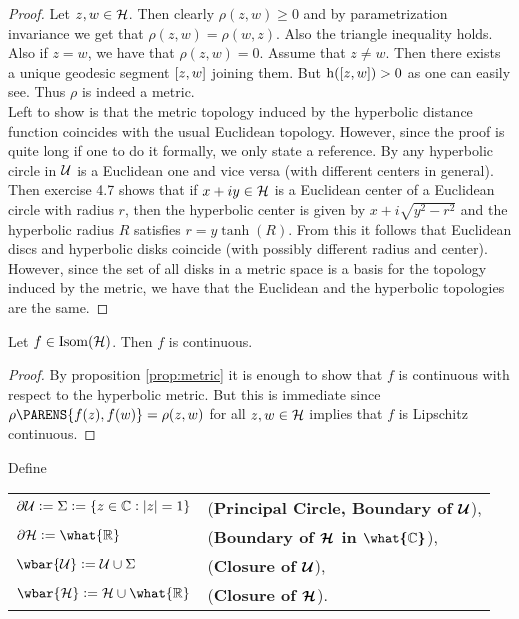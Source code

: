\begin{proof}
Let $z,w \in \mathcal{H}$. Then clearly $\rho(z,w) \geq 0$ and by parametrization invariance we get that $\rho(z,w) = \rho(w,z)$. Also the triangle inequality holds. Also if $z = w$, we have that $\rho(z,w) = 0$. Assume that $z \neq w$. Then there exists a unique geodesic segment $\sbr[0]{z,w}$ joining them. But $\h(\sbr[0]{z,w}) > 0$ as one can easily see. Thus $\rho$ is indeed a metric.\\
Left to show is that the metric topology induced by the hyperbolic distance function coincides with the usual Euclidean topology. However, since the proof is quite long if one to do it formally, we only state a reference. By \cite[127]{anderson:hyperbolic_geometry:2005} any hyperbolic circle in $\mathcal{U}$ is a Euclidean one and vice versa (with different centers in general). Then exercise 4.7 \cite[129]{anderson:hyperbolic_geometry:2005} shows that if $x + iy \in \mathcal{H}$ is a Euclidean center of a Euclidean circle with radius $r$, then the hyperbolic center is given by $x + i \sqrt{y^2 - r^2}$ and the hyperbolic radius $R$ satisfies $r = y \tanh(R)$. From this it follows that Euclidean discs and hyperbolic disks coincide (with possibly different radius and center). However, since the set of all disks in a metric space is a basis for the topology induced by the metric, we have that the Euclidean and the hyperbolic topologies are the same.
\end{proof}

\begin{proposition}
Let $f \in \mathrm{Isom}(\mathcal{H})$. Then $f$ is continuous.
\label{prop:continuous}
\end{proposition}

\begin{proof}
By proposition \ref{prop:metric} it is enough to show that $f$ is continuous with respect to the hyperbolic metric. But this is immediate since $\rho\PARENS{f(z),f(w)} = \rho(z,w)$ for all $z,w \in \mathcal{H}$ implies that $f$ is Lipschitz continuous.
\end{proof}

\begin{definition}
	Define
		\begin{center}
		\begin{tabular}{ll}
			$\partial \Ucal := \Sigma := \cbr[0]{z \in \Cbb : \abs[0]{z} = 1}$ & (\textbf{Principal Circle, Boundary of $\bm{\mathcal{U}}$}),\\
			$\partial \Hcal := \what{\Rbb}$ & (\textbf{Boundary of $\bm{\mathcal{H}}$ in $\bm{\what{\mathbb{C}}}$}),\\
			$\wbar{\Ucal} := \Ucal \cup \Sigma$ & (\textbf{Closure of $\bm{\mathcal{U}}$}),\\
			$\wbar{\Hcal} := \Hcal \cup \what{\Rbb}$ & (\textbf{Closure of $\bm{\mathcal{H}}$}).\\
		\end{tabular}
	\end{center}
\end{definition}

